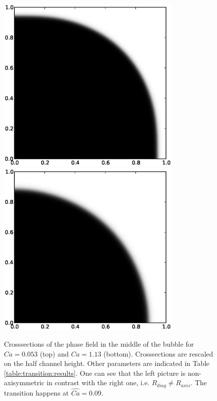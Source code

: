 \documentclass[preprint,12pt]{elsarticle}
\begin{document}
\begin{figure}[htb!]
\includegraphics[width=0.8\textwidth]{phase_crossection_ca5.eps}\\
\includegraphics[width=0.8\textwidth]{phase_crossection_ca13.eps}\\
\caption{Crosssections of the phase field in the middle of the bubble for $Ca=0.053$
(top) and $Ca=1.13$ (bottom). Crosssections are rescaled on the half channel height. Other
parameters are indicated in Table \ref{table:transition:results}. One can see that the left picture
is non-axisymmetric in contrast
with the right one, i.e. $R_{diag}\neq R_{axis}$. The transition happens at
$\widehat{Ca}=0.09$.\label{fig:crosssections:sym}}
\end{figure}
\end{document}
